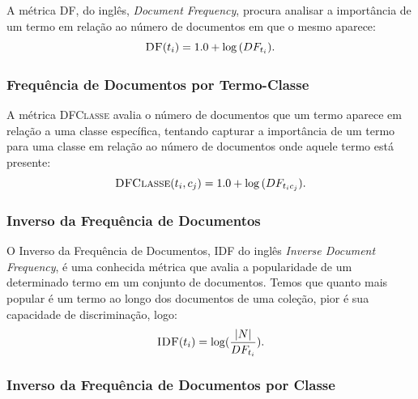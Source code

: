 A métrica \textsc{DF}, do inglês, \textit{Document Frequency}, procura analisar a importância de um termo em relação ao número de documentos em que o mesmo aparece:
\begin{equation}\label{eqn::df}
  \textsc{DF}(t_i) = 1.0 + \log{ ( DF_{t_i} ) }.
\end{equation}



\subsubsection{Frequência de Documentos por Termo-Classe}%
\label{subsubsection::sumdf}

A métrica \textsc{DFClasse} avalia o número de documentos que um termo aparece em relação a uma classe específica, tentando capturar a importância de um termo para uma classe em relação ao número de documentos onde aquele termo está presente:
\begin{equation}\label{eqn::sumtf}
 \textsc{DFClasse}(t_i,c_j) = 1.0 + \log{ ( DF_{t_ic_j} ) }.
\end{equation}


\subsubsection{Inverso da Frequência de Documentos}%
\label{subsubsection::idf}

O Inverso da Frequência de Documentos, \textsc{IDF} do inglês \textit{Inverse Document Frequency}, é uma conhecida métrica que avalia a popularidade de um determinado termo em um conjunto de documentos. Temos que quanto mais popular é um termo ao longo dos documentos de uma coleção, pior é sua capacidade de discriminação, logo:
\begin{equation}\label{eqn::tficf}
 \textsc{IDF}(t_i) = \log( \frac{|N|} {DF_{t_i}} ).
\end{equation}


\subsubsection{Inverso da Frequência de Documentos por Classe}%
\label{subsubsection::idf}

